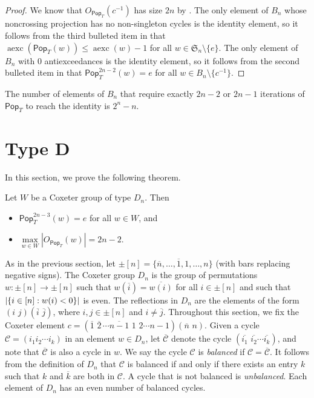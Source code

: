 \documentclass[ALCO,ThmDefs,Unicode,epreuves]{cedram}
\newcommand{\darkblue}{\color{darkblue}}
\newcommand{\defn}[1]{\emph{\darkblue #1}}
\newcommand{\pop}{\mathsf{Pop}}
\DeclareMathOperator{\aexc}{aexc}
\DeclarePairedDelimiter\abs{\lvert}{\rvert}
\begin{document}
\begin{proof}
We know that $O_{\pop_T}(c^{-1})$ has size $2n$ by . The only element of $B_n$ whose noncrossing projection has no non-singleton cycles is the identity element, so it follows from the third bulleted item in  that $\aexc(\pop_T(w))\leq\aexc(w)-1$ for all $w\in \mathfrak S_n\setminus\{e\}$. The only element of $B_n$ with $0$ antiexceedances is the identity element, so it follows from the second bulleted item in  that $\pop_T^{2n-2}(w)=e$ for all $w\in B_n\setminus\{c^{-1}\}$. 
\end{proof}


\begin{conj}	
\label{conj:B}
The number of elements of $B_n$ that require exactly $2n-2$ or $2n-1$ iterations of $\pop_T$ to reach the identity is $2^n-n$.
\end{conj}




\section{Type D}
\label{sec:typed}
In this section, we prove the following theorem.

\begin{theorem}
Let $W$ be a Coxeter group of type $D_n$. Then 
\begin{itemize}
    \item $\pop_T^{2n-3}(w)=e$ for all $w\in W$, and
    \item  $\max\limits _{w\in W}\left|O_{\pop_T}(w)\right|=2n-2$.
\end{itemize}
\end{theorem}


As in the previous section, let $\pm[n]=\{\overline n,\ldots,\overline 1,1,\ldots,n\}$ (with bars replacing negative signs). The Coxeter group $D_n$ is the group of permutations $w:\pm[n]\to\pm[n]$ such that $w(\overline i)=\overline{w(i)}$ for all $i\in\pm[n]$ and such that $\abs{\{i\in[n]:w(i)<0\}}$ is even. The reflections in $D_n$ are the elements of the form $(i\,\,j)(\overline i\,\,\overline j)$, where $i,j\in\pm[n]$ and $i\neq\overline j$. Throughout this section, we fix the Coxeter element 
$c=(\overline 1\,\,\overline 2\,\cdots\overline{n-1}\,\,1\,\,2\cdots n-1)(\overline n\,\,n)$. Given a cycle $\mathcal C=(i_1i_2\cdots i_k)$ in an element $w\in D_n$, let $\overline{\mathcal C}$ denote the cycle $(\overline{i_1}\,\,\overline{i_2}\cdots \overline{i_k})$, and note that $\overline{\mathcal C}$ is also a cycle in $w$. We say the cycle $\mathcal C$ is \defn{balanced} if $\mathcal C=\overline{\mathcal C}$. It follows from the definition of $D_n$ that $\mathcal C$ is balanced if and only if there exists an entry $k$ such that $k$ and $\overline k$ are both in $\mathcal C$. A cycle that is not balanced is \defn{unbalanced}. Each element of $D_n$ has an even number of balanced cycles. 
\end{document}
